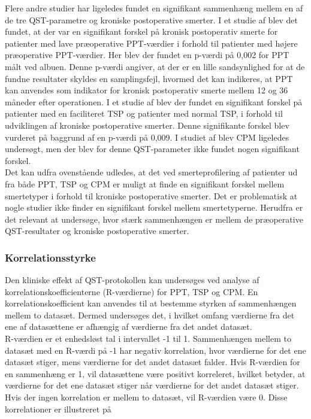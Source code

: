 Flere andre studier har ligeledes fundet en signifikant sammenhæng mellem en af de tre QST-parametre og kroniske postoperative smerter. \citep{Wylde2013} \citep{Wright2015} I et studie af  blev det fundet, at der var en signifikant forskel på kronisk postoperativ smerte for patienter med lave præoperative PPT-værdier i forhold til patienter med højere præoperative PPT-værdier. Her blev der fundet en p-værdi på 0,002 for PPT målt ved albuen. Denne p-værdi angiver, at der er en lille sandsynlighed for at de fundne resultater skyldes en samplingsfejl, hvormed det kan indikeres, at PPT kan anvendes som indikator for kronisk postoperativ smerte mellem 12 og 36 måneder efter operationen. \citep{Wright2015} I et studie af  blev der fundet en signifikant forskel på patienter med en faciliteret TSP og patienter med normal TSP, i forhold til udviklingen af kroniske postoperative smerter. Denne signifikante forskel blev vurderet på baggrund af en p-værdi på 0,009. I studiet af  blev CPM ligeledes undersøgt, men der blev for denne QST-parameter ikke fundet nogen signifikant forskel. \\
Det kan udfra ovenstående udledes, at det ved smerteprofilering af patienter ud fra både PPT, TSP og CPM er muligt at finde en signifikant forskel mellem smertetyper i forhold til kroniske postoperative smerter. Det er problematisk at nogle studier ikke finder en signifikant forskel mellem smertetyperne. \citep{Leary2016} Herudfra er det relevant at undersøge, hvor stærk sammenhængen er mellem de præoperative QST-resultater og kroniske postoperative smerter.

\subsubsection{Korrelationsstyrke}
Den kliniske effekt af QST-protokollen kan undersøges ved analyse af korrelationskoefficienterne (R-værdierne) for PPT, TSP og CPM. En korrelationskoefficient kan anvendes til at bestemme styrken af sammenhængen mellem to datasæt. Dermed undersøges det, i hvilket omfang værdierne fra det ene af datasættene er afhængig af værdierne fra det andet datasæt. \citep{Zar2010} \\
R-værdien er et enhedsløst tal i intervallet -1 til 1. Sammenhængen mellem to datasæt med en R-værdi på -1 har negativ korrelation, hvor værdierne for det ene datasæt stiger, mens værdierne for det andet datasæt falder. Hvis R-værdien for en sammenhæng er 1, vil datasættene være positivt korreleret, hvilket betyder, at værdierne for det ene datasæt stiger når værdierne for det andet datasæt stiger. Hvis der ingen korrelation er mellem to datasæt, vil R-værdien være 0. \citep{Zar2010} Disse korrelationer er illustreret på 

